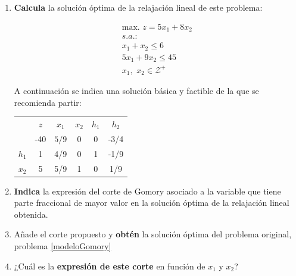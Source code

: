 \begin{enumerate}
    \item{\textbf{Calcula} la solución óptima de la relajación lineal de este problema:
    
\begin{equation}
\begin{split}
\mbox{max. } z = 5x_1 + 8x_2\\
s.a.:\\
x_1 + x_2 \leq  6\\
5x_1 + 9x_2 \leq 45\\
x_1,\,\,x_2 \in  \mathcal{Z}^+
\end{split}
\label{modeloGomory}
\end{equation}

    A continuación se indica una solución básica y factible de la que se recomienda partir:


\begin{center}
\begin{tabular}{c|c|cccc|}
 & $z$ & $x_1$ & $x_2$ &  $h_1$ & $h_2$ \\ 
 & -40 & $5/9$ & 0  & 0 & -3/4 \\ 
\hline
$h_1$ & 1  & 4/9 & 0 & 1 & -1/9\\ 
$x_2$ & 5  & 5/9 & 1 & 0 & 1/9\\ 
\hline
\end{tabular}
\end{center}

    
    }

    \item{\textbf{Indica} la expresión del corte de Gomory asociado a la variable que tiene parte fraccional de mayor valor en la solución óptima de la relajación lineal obtenida.}
    \item {Añade el corte propuesto y \textbf{obtén} la solución óptima del problema original, problema \eqref{modeloGomory}}
    \item{¿Cuál es la \textbf{expresión de este corte} en función de $x_1$ y $x_2$?}

\end{enumerate}


